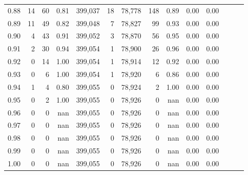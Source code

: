 \begin{tabular}{rrrrrrrrrrrrrr}
0.88 &      14 &     60 &  0.81 &  399,037 &       18 &  78,778 &     148 &  0.89 &  0.00 &      0.00 \\
0.89 &      11 &     49 &  0.82 &  399,048 &        7 &  78,827 &      99 &  0.93 &  0.00 &      0.00 \\
0.90 &       4 &     43 &  0.91 &  399,052 &        3 &  78,870 &      56 &  0.95 &  0.00 &      0.00 \\
0.91 &       2 &     30 &  0.94 &  399,054 &        1 &  78,900 &      26 &  0.96 &  0.00 &      0.00 \\
0.92 &       0 &     14 &  1.00 &  399,054 &        1 &  78,914 &      12 &  0.92 &  0.00 &      0.00 \\
0.93 &       0 &      6 &  1.00 &  399,054 &        1 &  78,920 &       6 &  0.86 &  0.00 &      0.00 \\
0.94 &       1 &      4 &  0.80 &  399,055 &        0 &  78,924 &       2 &  1.00 &  0.00 &      0.00 \\
0.95 &       0 &      2 &  1.00 &  399,055 &        0 &  78,926 &       0 &   nan &  0.00 &      0.00 \\
0.96 &       0 &      0 &   nan &  399,055 &        0 &  78,926 &       0 &   nan &  0.00 &      0.00 \\
0.97 &       0 &      0 &   nan &  399,055 &        0 &  78,926 &       0 &   nan &  0.00 &      0.00 \\
0.98 &       0 &      0 &   nan &  399,055 &        0 &  78,926 &       0 &   nan &  0.00 &      0.00 \\
0.99 &       0 &      0 &   nan &  399,055 &        0 &  78,926 &       0 &   nan &  0.00 &      0.00 \\
1.00 &       0 &      0 &   nan &  399,055 &        0 &  78,926 &       0 &   nan &  0.00 &      0.00 \\
\bottomrule
\end{tabular}
